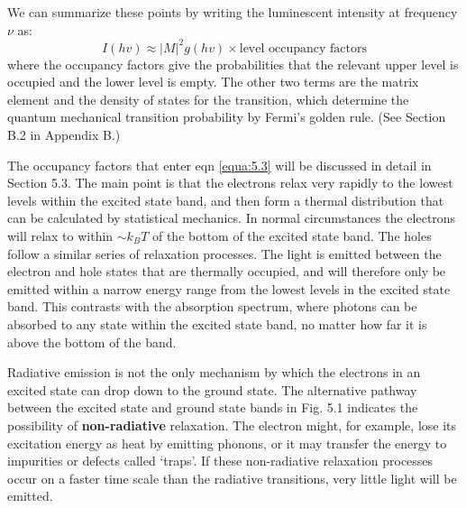 \documentclass[12pt]{book}
\begin{document}
We can summarize these points by writing the luminescent intensity at frequency $\nu$ as:
\begin{equation}\label{equa:5.3}
  I(hv)\approx|M|^2g(hv)\times{\text{level occupancy factors}}
\end{equation}
where the occupancy factors give the probabilities that the relevant upper level is occupied and the lower level is empty. The other two terms are the matrix element and the density of states for the transition, which determine the quantum
mechanical transition probability by Fermi's golden rule. (See Section B.2 in Appendix B.)

The occupancy factors that enter eqn \ref{equa:5.3} will be discussed in detail in Section 5.3. The main point is that the electrons relax very rapidly to the lowest levels within the excited state band, and then form a thermal distribution that can be calculated by statistical mechanics. In normal circumstances the electrons will relax to within $\sim k_BT$ of the bottom of the excited state band. The holes follow a similar series of relaxation processes. The light is emitted between the electron and hole states that are thermally occupied, and will therefore only be emitted within a narrow energy range from the lowest levels in the excited state band. This contrasts with the absorption spectrum, where photons can be absorbed to any state within the excited state band, no matter how far it is above the bottom of the band.

Radiative emission is not the only mechanism by which the electrons in an excited state can drop down to the ground state. The alternative pathway between the excited state and ground state bands in Fig. 5.1 indicates the possibility of \textbf{non-radiative} relaxation. The electron might, for example, lose its excitation energy as heat by emitting phonons, or it may transfer the energy to impurities or defects called `traps'. If these non-radiative relaxation processes occur on a faster time scale than the radiative transitions, very little light will be emitted.
\end{document}
